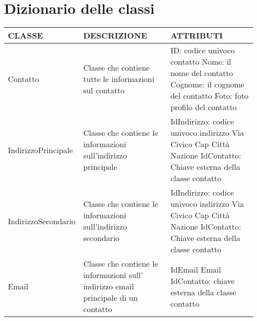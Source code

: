 \documentclass{article}
\begin{document}
    \section{\LARGE Dizionario delle classi}
        \begin{tabular}{| m{3cm} | m{6cm}| m{6cm} |}
            \hline
            \textbf{CLASSE} &\textbf{DESCRIZIONE} & \textbf{ATTRIBUTI}\\
            \hline
            Contatto & Classe che contiene tutte le informazioni sul contatto &
            ID: codice univoco contatto\newline
            Nome: il nome del contatto\newline
            Cognome: il cognome del contatto\newline
            Foto: foto profilo del contatto\\
            \hline
            IndirizzoPrincipale & Classe che contiene le informazioni sull'indirizzo principale &
            IdIndirizzo: codice univoco indirizzo\newline
            Via\newline
            Civico\newline
            Cap\newline
            Città\newline
            Nazione\newline
            IdContatto: Chiave esterna della classe contatto\newline\\
            \hline
            IndirizzoSecondario & Classe che contiene le informazioni sull'indirizzo secondario &
            IdIndirizzo: codice univoco indirizzo\newline
            Via\newline
            Civico\newline
            Cap\newline
            Città\newline
            Nazione\newline
            IdContatto: Chiave esterna della classe contatto\newline\\
            \hline
            Email & Classe che contiene le informazioni sull' indirizzo email principale di un contatto &
            IdEmail\newline
            Email\newline
            IdContatto: chiave esterna della classe contatto\\

\end{tabular}
\end{document}

